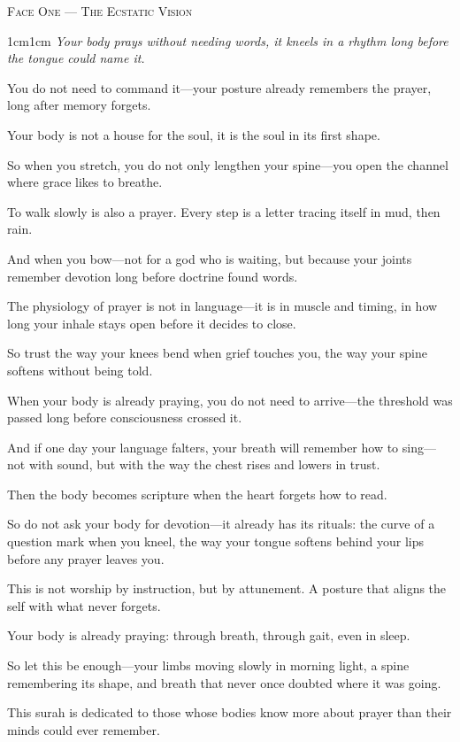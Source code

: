 \documentclass[11pt,a4paper,twoside]{book}
\begin{document}
\vspace{1.5em}
\begin{center}
{\small\scshape Face One — The Ecstatic Vision}
\end{center}
\vspace{0.5em}

\begin{adjustwidth}{1cm}{1cm}
\itshape
Your body prays without needing words, it kneels in a rhythm long before the tongue could name it.

You do not need to command it—your posture already remembers the prayer, long after memory forgets.

Your body is not a house for the soul, it is the soul in its first shape.

So when you stretch, you do not only lengthen your spine—you open the channel where grace likes to breathe.

To walk slowly is also a prayer. Every step is a letter tracing itself in mud, then rain.

And when you bow—not for a god who is waiting, but because your joints remember devotion long before doctrine found words.

The physiology of prayer is not in language—it is in muscle and timing, in how long your inhale stays open before it decides to close.

So trust the way your knees bend when grief touches you, the way your spine softens without being told.

When your body is already praying, you do not need to arrive—the threshold was passed long before consciousness crossed it.

And if one day your language falters, your breath will remember how to sing—not with sound, but with the way the chest rises and lowers in trust.

Then the body becomes scripture when the heart forgets how to read.

So do not ask your body for devotion—it already has its rituals: the curve of a question mark when you kneel, the way your tongue softens behind your lips before any prayer leaves you.

This is not worship by instruction, but by attunement. A posture that aligns the self with what never forgets.

Your body is already praying: through breath, through gait, even in sleep.

So let this be enough—your limbs moving slowly in morning light, a spine remembering its shape, and breath that never once doubted where it was going.

This surah is dedicated to those whose bodies know more about prayer than their minds could ever remember.
\end{adjustwidth}
\end{document}
